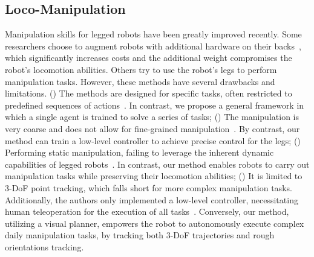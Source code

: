 \subsection{Loco-Manipulation}
Manipulation skills for legged robots have been greatly improved recently. Some researchers choose to augment robots with additional hardware on their backs~\cite{fu2022deep,Versatile2023,gofetch,forrai2023event}, which significantly increases costs and the additional weight compromises the robot's locomotion abilities. Others try to use the robot's legs to perform manipulation tasks. However, these methods have several drawbacks and limitations.
() The methods are designed for specific tasks, often restricted to predefined sequences of actions~\cite{cheng2023legmanip, huang2023creating, ji2023Hierarchical,Ji2023DribbleBot}. 
In contrast, we propose a general framework in which a single agent is trained to solve a series of tasks; 
() The manipulation is very coarse and does not allow for fine-grained manipulation~\cite{huang2023creating,Ji2023DribbleBot}. 
By contrast, our method can train a low-level controller to achieve precise control for the legs; 
() Performing static manipulation, failing to leverage the inherent dynamic capabilities of legged robots~\cite{ji2023Hierarchical}. In contrast, our method enables robots to carry out manipulation tasks while preserving their locomotion abilities; 
() It is limited to 3-DoF point tracking, which falls short for more complex manipulation tasks. Additionally, the authors only implemented a low-level controller, necessitating human teleoperation for the execution of all tasks~\cite{arm2024pedipulate}. 
Conversely, our method, utilizing a visual planner, empowers the robot to autonomously execute complex daily manipulation tasks, by tracking both 3-DoF trajectories and rough orientations tracking. 
